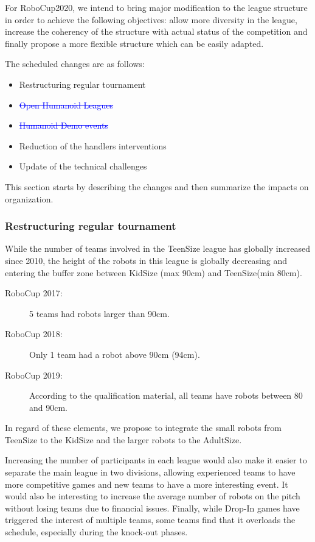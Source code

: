 \documentclass{article}
\newcommand{\removed}[1]{\textcolor{blue}{\sout{#1}}}
\newcommand{\added}[1]{{\color{magenta}{#1}}}
\begin{document}
For RoboCup2020, we intend to bring major modification to the league structure
in order to achieve the following objectives:
allow more diversity in the league,
increase the coherency of the structure with actual status of the competition
and finally propose a more flexible structure which can be easily adapted.

The scheduled changes are as follows:
\begin{itemize}
\item Restructuring regular tournament \added{refered to as Humanoid Soccer Competition (HSC)}
\item \added{Humanoid Open Competition (HOC)} \removed{Open Humanoid Leagues}
\item \added{Humanoid Research Demonstration (HRD)} \removed{Humanoid Demo events}
\item Reduction of the handlers interventions
\item Update of the technical challenges
\end{itemize}

This section starts by describing the changes and then summarize the impacts on
organization.


\subsubsection{Restructuring regular tournament}

While the number of teams involved in the TeenSize league has globally increased
since 2010, the height of the robots in this league is globally decreasing and
entering the buffer zone between KidSize (max 90cm) and TeenSize(min 80cm).
\begin{description}
\item[RoboCup 2017:] 5 teams had robots larger than 90cm.
\item[RoboCup 2018:] Only 1 team had a robot above 90cm (94cm).
\item[RoboCup 2019:] According to the qualification material, all teams have
  robots between 80 and 90cm.
\end{description}

In regard of these elements, we propose to integrate the small robots from
TeenSize to the KidSize and the larger robots to the AdultSize.

Increasing the number of participants in each league would also make it easier
to separate the main league in two divisions, allowing experienced teams to have
more competitive games and new teams to have a more interesting event.
It would also be interesting to increase the average number of robots on
the pitch without losing teams due to financial issues.
Finally, while Drop-In games have triggered the interest of multiple teams,
some teams find that it overloads the schedule, especially during the knock-out
phases.
\end{document}

